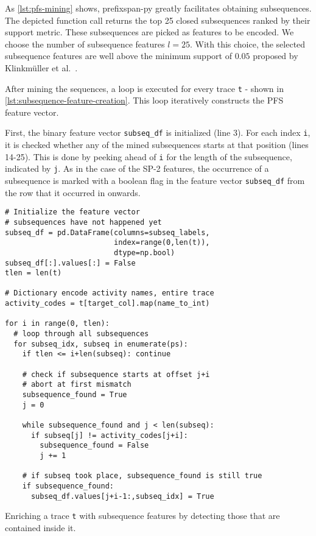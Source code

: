 As \autoref{lst:pfs-mining} shows, prefixspan-py greatly facilitates obtaining subsequences. The depicted function call returns the top 25 closed subsequences ranked by their support metric. These subsequences are picked as features to be encoded.
We choose the number of subsequence features $l=25$.
With this choice, the selected subsequence features are well above the minimum support of $0.05$ proposed by Klinkmüller et al.~\cite{klinkmuller2018reliablemonitoring}.

After mining the sequences, a loop is executed for every trace \verb=t= - shown in \autoref{lst:subsequence-feature-creation}. This loop iteratively constructs the PFS feature vector.

First, the binary feature vector \verb=subseq_df= is initialized (line 3). For each index \verb=i=, it is checked whether any of the mined subsequences starts at that position (lines 14-25). This is done by peeking ahead of \verb=i= for the length of the subsequence, indicated by \verb=j=. As in the case of the SP-2 features, the occurrence of a subsequence is marked with a boolean flag in the feature vector \verb=subseq_df= from the row that it occurred in onwards.

\begin{listing}[ht]
\begin{verbatim}
# Initialize the feature vector
# subsequences have not happened yet
subseq_df = pd.DataFrame(columns=subseq_labels,
                         index=range(0,len(t)),
                         dtype=np.bool)
subseq_df[:].values[:] = False
tlen = len(t)

# Dictionary encode activity names, entire trace
activity_codes = t[target_col].map(name_to_int)

for i in range(0, tlen):
  # loop through all subsequences
  for subseq_idx, subseq in enumerate(ps):
    if tlen <= i+len(subseq): continue

    # check if subsequence starts at offset j+i
    # abort at first mismatch
    subsequence_found = True
    j = 0

    while subsequence_found and j < len(subseq):
      if subseq[j] != activity_codes[j+i]:
        subsequence_found = False
        j += 1

    # if subseq took place, subsequence_found is still true
    if subsequence_found:
      subseq_df.values[j+i-1:,subseq_idx] = True
\end{verbatim}
\caption{Enriching a trace \texttt{t} with subsequence features by detecting those that are contained inside it.}
\label{lst:subsequence-feature-creation}
\end{listing}

